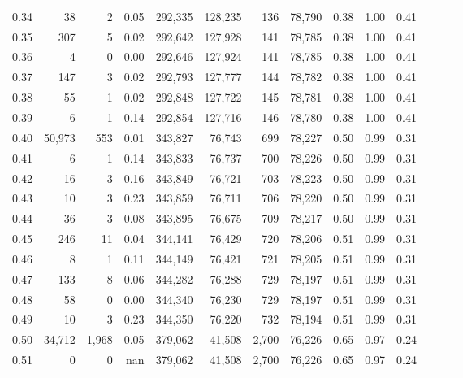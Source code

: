 \begin{tabular}{rrrrrrrrrrrrrr}
0.34 &      38 &       2 &  0.05 &  292,335 &  128,235 &     136 &  78,790 &  0.38 &  1.00 &      0.41 \\
0.35 &     307 &       5 &  0.02 &  292,642 &  127,928 &     141 &  78,785 &  0.38 &  1.00 &      0.41 \\
0.36 &       4 &       0 &  0.00 &  292,646 &  127,924 &     141 &  78,785 &  0.38 &  1.00 &      0.41 \\
0.37 &     147 &       3 &  0.02 &  292,793 &  127,777 &     144 &  78,782 &  0.38 &  1.00 &      0.41 \\
0.38 &      55 &       1 &  0.02 &  292,848 &  127,722 &     145 &  78,781 &  0.38 &  1.00 &      0.41 \\
0.39 &       6 &       1 &  0.14 &  292,854 &  127,716 &     146 &  78,780 &  0.38 &  1.00 &      0.41 \\
0.40 &  50,973 &     553 &  0.01 &  343,827 &   76,743 &     699 &  78,227 &  0.50 &  0.99 &      0.31 \\
0.41 &       6 &       1 &  0.14 &  343,833 &   76,737 &     700 &  78,226 &  0.50 &  0.99 &      0.31 \\
0.42 &      16 &       3 &  0.16 &  343,849 &   76,721 &     703 &  78,223 &  0.50 &  0.99 &      0.31 \\
0.43 &      10 &       3 &  0.23 &  343,859 &   76,711 &     706 &  78,220 &  0.50 &  0.99 &      0.31 \\
0.44 &      36 &       3 &  0.08 &  343,895 &   76,675 &     709 &  78,217 &  0.50 &  0.99 &      0.31 \\
0.45 &     246 &      11 &  0.04 &  344,141 &   76,429 &     720 &  78,206 &  0.51 &  0.99 &      0.31 \\
0.46 &       8 &       1 &  0.11 &  344,149 &   76,421 &     721 &  78,205 &  0.51 &  0.99 &      0.31 \\
0.47 &     133 &       8 &  0.06 &  344,282 &   76,288 &     729 &  78,197 &  0.51 &  0.99 &      0.31 \\
0.48 &      58 &       0 &  0.00 &  344,340 &   76,230 &     729 &  78,197 &  0.51 &  0.99 &      0.31 \\
0.49 &      10 &       3 &  0.23 &  344,350 &   76,220 &     732 &  78,194 &  0.51 &  0.99 &      0.31 \\
0.50 &  34,712 &   1,968 &  0.05 &  379,062 &   41,508 &   2,700 &  76,226 &  0.65 &  0.97 &      0.24 \\
0.51 &       0 &       0 &   nan &  379,062 &   41,508 &   2,700 &  76,226 &  0.65 &  0.97 &      0.24 \\

\end{tabular}
